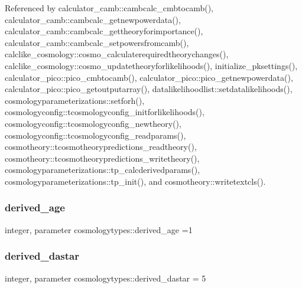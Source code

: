 Referenced by calculator\+\_\+camb\+::cambcalc\+\_\+cmbtocamb(), calculator\+\_\+camb\+::cambcalc\+\_\+getnewpowerdata(), calculator\+\_\+camb\+::cambcalc\+\_\+gettheoryforimportance(), calculator\+\_\+camb\+::cambcalc\+\_\+setpowersfromcamb(), calclike\+\_\+cosmology\+::cosmo\+\_\+calculaterequiredtheorychanges(), calclike\+\_\+cosmology\+::cosmo\+\_\+updatetheoryforlikelihoods(), initialize\+\_\+pksettings(), calculator\+\_\+pico\+::pico\+\_\+cmbtocamb(), calculator\+\_\+pico\+::pico\+\_\+getnewpowerdata(), calculator\+\_\+pico\+::pico\+\_\+getoutputarray(), datalikelihoodlist\+::setdatalikelihoods(), cosmologyparameterizations\+::setforh(), cosmologyconfig\+::tcosmologyconfig\+\_\+initforlikelihoods(), cosmologyconfig\+::tcosmologyconfig\+\_\+newtheory(), cosmologyconfig\+::tcosmologyconfig\+\_\+readparams(), cosmotheory\+::tcosmotheorypredictions\+\_\+readtheory(), cosmotheory\+::tcosmotheorypredictions\+\_\+writetheory(), cosmologyparameterizations\+::tp\+\_\+calcderivedparams(), cosmologyparameterizations\+::tp\+\_\+init(), and cosmotheory\+::writetextcls().

\mbox{\label{namespacecosmologytypes_ac41d8787a0c66b372de6431ec8d5d90e}} 
\subsubsection{\texorpdfstring{derived\+\_\+age}{derived\_age}}
{\footnotesize\ttfamily integer, parameter cosmologytypes\+::derived\+\_\+age =1}

\mbox{\label{namespacecosmologytypes_ad7c434d95788f75aebc8ad1a2344ae22}} 
\subsubsection{\texorpdfstring{derived\+\_\+dastar}{derived\_dastar}}
{\footnotesize\ttfamily integer, parameter cosmologytypes\+::derived\+\_\+dastar = 5}

\mbox{\label{namespacecosmologytypes_aced8968e4a5258b1eb562971c4d49d5c}} 
